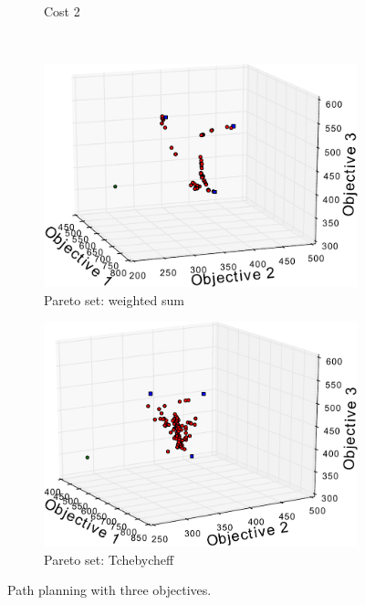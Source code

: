 \documentclass{article}
\begin{document}
\begin{figure}[h!]
\begin{subfigure}[b]{0.26\linewidth}
		\caption{Cost 2}
		\label{fig:sim:many:fitness2}
	\end{subfigure}  \\
	\begin{subfigure}[b]{0.3\linewidth}
		\centering
		\includegraphics[width=\textwidth]{fig/sim6-3obj/PF06-MORRT.pdf}
		\caption{Pareto set: weighted sum}
		\label{fig:sim:many:pf:a}
	\end{subfigure}
	\begin{subfigure}[b]{0.3\linewidth}
		\centering
		\includegraphics[width=\textwidth]{fig/sim7-3obj/PF07-MORRT2.pdf}
		\caption{Pareto set: Tchebycheff}
		\label{fig:sim:many:pf:b}
	\end{subfigure} 
	\caption{Path planning with three objectives.}
	\label{fig:sim:many}
\end{figure}
\end{document}
